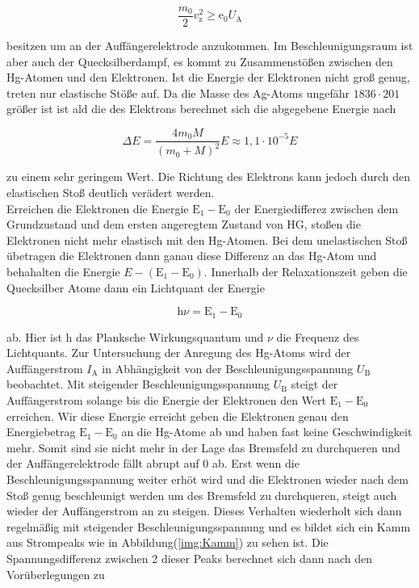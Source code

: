         \begin{equation*}
            \frac{m_0}{2} v_{\text{z}}^2 \geq \text{e}_0 U_{\text{A}}
        \end{equation*}

        \noindent besitzen um an der Auffängerelektrode anzukommen.
        Im Beschleunigungsraum ist aber auch der Quecksilberdampf, es kommt zu Zusammenstößen zwischen den Hg-Atomen und den Elektronen.
        Ist die Energie der Elektronen nicht groß genug, treten nur elastische Stöße auf. Da die Masse des Ag-Atoms ungefähr $1836 \cdot 201$ 
        größer ist ist ald die des Elektrons berechnet sich die abgegebene Energie nach 

        \begin{equation*}
            \Delta E = \frac{4 m_0 M}{\left(m_0 + M \right)^2} E \approx 1,1 \cdot 10^{-5} E
        \end{equation*}

        \noindent zu einem sehr geringem Wert. Die Richtung des Elektrons kann jedoch durch den elastischen Stoß deutlich verädert werden.\\
        Erreichen die Elektronen die Energie $\text{E}_1 - \text{E}_0$ der Energiedifferez zwischen dem Grundzustand und dem ersten angeregtem Zustand von HG, 
        stoßen die Elektronen nicht mehr elastisch mit den Hg-Atomen. Bei dem unelastischen Stoß übetragen die Elektronen dann ganau diese 
        Differenz an das Hg-Atom und behahalten die Energie $E - (\text{E}_1 - \text{E}_0)$. Innerhalb der Relaxationszeit geben die Quecksilber 
        Atome dann ein Lichtquant der Energie

        \begin{equation*}
            \text{h} \nu = \text{E}_1 - \text{E}_0 
        \end{equation*}

        \noindent ab. Hier ist h das Planksche Wirkungsquantum und $\nu$ die Frequenz des Lichtquants.
        Zur Untersuchung der Anregung des Hg-Atoms wird der Auffängerstrom $I_\text{A}$ in Abhängigkeit von der Beschleunigungsspannung $U_\text{B}$ 
        beobachtet. Mit steigender Beschleunigungsspannung $U_\text{B}$ steigt der Auffängerstrom solange bis die Energie der Elektronen 
        den Wert $\text{E}_1 - \text{E}_0$ erreichen. Wir diese Energie erreicht geben die Elektronen genau den Energiebetrag $\text{E}_1 - \text{E}_0$ 
        an die Hg-Atome ab und haben fast keine Geschwindigkeit mehr. Somit sind sie nicht mehr in der Lage das Bremsfeld zu durchqueren und der 
        Auffängerelektrode fällt abrupt auf 0 ab. Erst wenn die Beschleunigungsspannung weiter erhöt wird und die Elektronen wieder nach dem 
        Stoß genug beschleunigt werden um des Bremsfeld zu durchqueren, steigt auch wieder der Auffängerstrom an zu steigen. Dieses Verhalten 
        wiederholt sich dann regelmäßig mit steigender Beschleunigungsspannung und es bildet sich ein Kamm aus Strompeaks wie in Abbildung(\ref{img:Kamm})
        zu sehen ist. Die Spannungsdifferenz zwischen 2 dieser Peaks berechnet sich dann nach den Vorüberlegungen zu 

